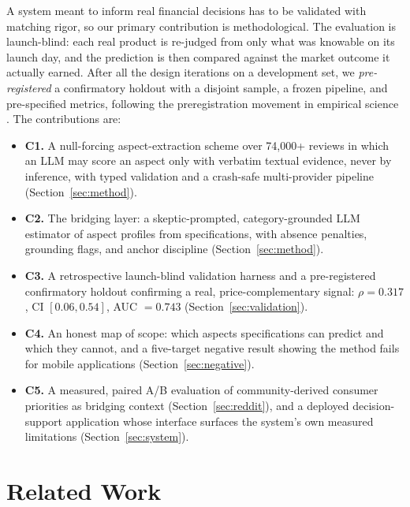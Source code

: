 \documentclass[journal]{IEEEtran}
\begin{document}
A system meant to inform real financial decisions has to be validated with matching rigor, so our primary contribution is methodological. The evaluation is launch-blind: each real product is re-judged from only what was knowable on its launch day, and the prediction is then compared against the market outcome it actually earned. After all the design iterations on a development set, we \emph{pre-registered} a confirmatory holdout with a disjoint sample, a frozen pipeline, and pre-specified metrics, following the preregistration movement in empirical science \cite{nosek2018preregistration}. The contributions are:

\begin{itemize}
\item \textbf{C1.} A null-forcing aspect-extraction scheme over 74{,}000+ reviews in which an LLM may score an aspect only with verbatim textual evidence, never by inference, with typed validation and a crash-safe multi-provider pipeline (Section~\ref{sec:method}).
\item \textbf{C2.} The bridging layer: a skeptic-prompted, category-grounded LLM estimator of aspect profiles from specifications, with absence penalties, grounding flags, and anchor discipline (Section~\ref{sec:method}).
\item \textbf{C3.} A retrospective launch-blind validation harness and a pre-registered confirmatory holdout confirming a real, price-complementary signal: $\rho = 0.317$, CI $[0.06,0.54]$, AUC $=0.743$ (Section~\ref{sec:validation}).
\item \textbf{C4.} An honest map of scope: which aspects specifications can predict and which they cannot, and a five-target negative result showing the method fails for mobile applications (Section~\ref{sec:negative}).
\item \textbf{C5.} A measured, paired A/B evaluation of community-derived consumer priorities as bridging context (Section~\ref{sec:reddit}), and a deployed decision-support application whose interface surfaces the system's own measured limitations (Section~\ref{sec:system}).
\end{itemize}

\section{Related Work}
\label{sec:related}
\end{document}

